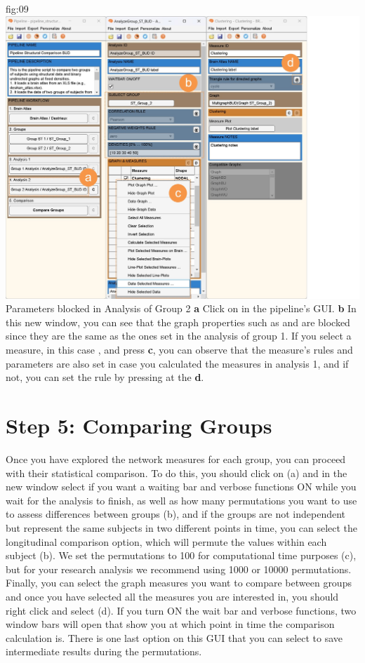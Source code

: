 \documentclass[justified]{tufte-handout}
\begin{document}
	{fig:09}
	{\includegraphics{fig09.jpg}}
	{Parameters blocked in Analysis of Group 2}
	{
	{\bf a} Click on  in the pipeline's GUI.
	{\bf b} In this new window, you can see that the graph properties such as  and  are blocked since they are the same as the ones set in the analysis of group 1. If you select a measure, in this case , and press  {\bf c}, you can observe that the measure's rules and parameters are also set in case you calculated the measures in analysis 1, and if not, you can set the rule by pressing at the  {\bf d}.
	}


\section{Step 5: Comparing Groups}

Once you have explored the network measures for each group, you can proceed with their statistical comparison. To do this, you should click on  (a) and in the new window select if you want a waiting bar and verbose functions ON while you wait for the analysis to finish, as well as how many permutations you want to use to assess differences between groups (b), and if the groups are not independent but represent the same subjects in two different points in time, you can select the longitudinal comparison option, which will permute the values within each subject (b). We set the permutations to 100 for computational time purposes (c), but for your research analysis we recommend using 1000 or 10000 permutations. Finally, you can select the graph measures you want to compare between groups and once you have selected all the measures you are interested in, you should right click and select  (d). If you turn ON the wait bar and verbose functions, two window bars will open that show you at which point in time the comparison calculation is. There is one last option on this GUI that you can select to save intermediate results during the permutations.
\end{document}

